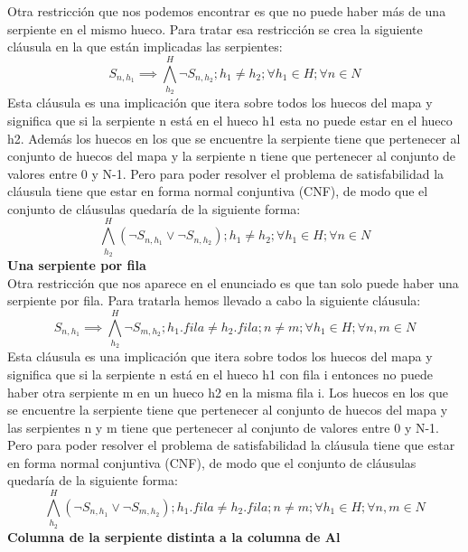 \documentclass[11pt,spanish]{article}
\begin{document}
			Otra restricción que nos podemos encontrar es que no puede haber más de una serpiente en el mismo hueco. Para tratar esa restricción se crea la siguiente cláusula en la que están implicadas las serpientes:
			\begin{equation*}
				S_{n,h_1} \implies \bigwedge\limits_{h_2}^H \neg S_{n,h_2}; h_1 \neq h_2; \forall h_1\in H; \forall n \in N
			\end{equation*}
			Esta cláusula es una implicación que itera sobre todos los huecos del mapa y significa que si la serpiente n está en el hueco h1 esta no puede estar en el hueco h2. Además los huecos en los que se encuentre la serpiente tiene que pertenecer al conjunto de huecos del mapa y la serpiente n tiene que pertenecer al conjunto de valores entre 0 y N-1. Pero para poder resolver el problema de satisfabilidad la cláusula tiene que estar en forma normal conjuntiva (CNF), de modo que el conjunto de cláusulas quedaría de la siguiente forma:
			\begin{equation*}
				\bigwedge\limits_{h_2}^H (\neg S_{n,h_1} \lor \neg S_{n,h_2}); h_1 \neq h_2; \forall h_1\in H; \forall n \in N
			\end{equation*}
			\textbf{Una serpiente por fila}\\
			Otra restricción que nos aparece en el enunciado es que tan solo puede haber una serpiente por fila. Para tratarla hemos llevado a cabo la siguiente cláusula:
			\begin{equation*}
				S_{n,h_1} \implies \bigwedge\limits_{h_2}^H \neg S_{m,h_2}; h_1.fila \neq h_2.fila; n \neq m; \forall h_1 \in H; \forall n,m \in N
			\end{equation*}
			Esta cláusula es una implicación que itera sobre todos los huecos del mapa y significa que si la serpiente n está en el hueco h1 con fila i entonces no puede haber otra serpiente m en un hueco h2 en la misma fila i. Los huecos en los que se encuentre la serpiente tiene que pertenecer al conjunto de huecos del mapa y las serpientes n y m tiene que pertenecer al conjunto de valores entre 0 y N-1. Pero para poder resolver el problema de satisfabilidad la cláusula tiene que estar en forma normal conjuntiva (CNF), de modo que el conjunto de cláusulas quedaría de la siguiente forma:
			\begin{equation*}
				\bigwedge\limits_{h_2}^H (\neg S_{n,h_1} \lor \neg S_{m,h_2}); h_1.fila \neq h_2.fila; n \neq m; \forall h_1 \in H; \forall n,m \in N
			\end{equation*}
			\textbf{Columna de la serpiente distinta a la columna de Al}\\
\end{document}

